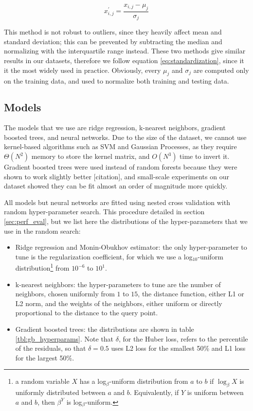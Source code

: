 \documentclass[12pt]{book}
\begin{document}
\begin{equation}
\label{eq:standardization}
x^\prime_{i,j}=\frac{x_{i,j}-\mu_j}{\sigma_j}
\end{equation}

This method is not robust to outliers, since they heavily affect mean and standard deviation; this can be prevented by subtracting the median and normalizing with the interquartile range instead. These two methods give similar results in our datasets, therefore we follow equation \ref{eq:standardization}, since it it the most widely used in practice. Obviously, every $\mu_j$ and $\sigma_j$ are computed only on the training data, and used to normalize both training and testing data.

\subsection{Models}

The models that we use are ridge regression, k-nearest neighbors, gradient boosted trees, and neural networks. Due to the size of the dataset, we cannot use kernel-based algorithms such as SVM and Gaussian Processes, as they require $\Theta(N^2)$ memory to store the kernel matrix, and $O(N^3)$ time to invert it. Gradient boosted trees were used instead of random forests because they were shown to work slightly better [citation], and small-scale experiments on our dataset showed they can be fit almost an order of magnitude more quickly.

All models but neural networks are fitted using nested cross validation with random hyper-parameter search. This procedure detailed in section \ref{sec:perf_eval}, but we list here the distributions of the hyper-parameters that we use in the random search:

\begin{itemize}
\item Ridge regression and Monin-Obukhov estimator: the only hyper-parameter to tune is the regularization coefficient, for which we use a log$_{10}$-uniform distribution\footnote{a random variable $X$ has a log$_\beta$-uniform distribution from $a$ to $b$ if $\log_\beta X$ is uniformly distributed between $a$ and $b$. Equivalently, if $Y$ is uniform between $a$ and $b$, then $\beta^Y$ is log$_\beta$-uniform.} from $10^{-6}$ to $10^{1}$.

\item k-nearest neighbors: the hyper-parameters to tune are the number of neighbors, chosen uniformly from $1$ to $15$, the distance function, either L1 or L2 norm, and the weights of the neighbors, either uniform or directly proportional to the distance to the query point.

\item Gradient boosted trees: the distributions are shown in table \ref{tbl:gb_hyperparams}. Note that $\delta$, for the Huber loss, refers to the percentile of the residuals, so that $\delta=0.5$ uses L2 loss for the smallest 50\% and L1 loss for the largest 50\%.
\end{itemize}
\end{document}
